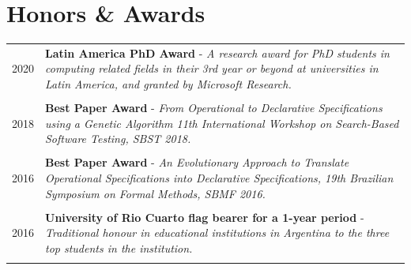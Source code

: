\documentclass[a4paper,10pt]{article} %
\begin{document}
\section{Honors \& Awards}
\begin{longtable}{>{\raggedleft\arraybackslash}p{} p{}}

\textsc{2020} & \textbf{Latin America PhD Award} - \textit{A research award for PhD students in computing related fields in their 3rd year or beyond at universities in Latin America, and granted by Microsoft Research.} \\ & \\

\textsc{2018} & \textbf{Best Paper Award} - \textit{From Operational to Declarative Specifications using a Genetic Algorithm 11th International Workshop on Search-Based Software Testing, SBST 2018.} \\ & \\

\textsc{2016} & \textbf{Best Paper Award} - \textit{An Evolutionary Approach to Translate Operational Specifications into Declarative Specifications, 19th Brazilian Symposium on Formal Methods, SBMF 2016.} \\ & \\

\textsc{2016} & \textbf{University of Rio Cuarto flag bearer for a 1-year period} - \textit{Traditional honour in educational institutions in Argentina to the three top students in the institution.} \\ & \\
\end{longtable}


\end{document}
